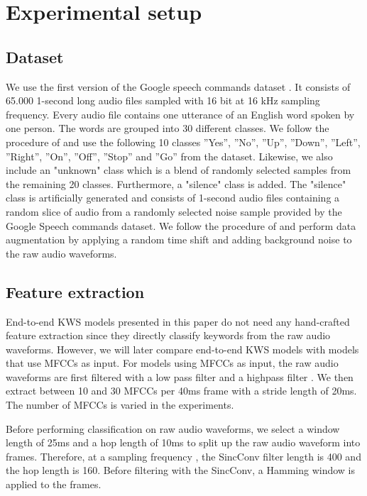 \documentclass[a4paper]{article}
\begin{document}
\section{Experimental setup}
\label{sec:experimental_setup}

\subsection{Dataset}
We use the first version of the Google speech commands dataset \cite{Warden2018}. It consists of 65.000 1-second long audio files sampled with 16 bit at 16 kHz sampling frequency. Every audio file contains one utterance of an English word spoken by one person. The words are grouped into 30 different classes. We follow the procedure of \cite{Tang2017} and use the following 10 classes ”Yes”, ”No”, ”Up”, ”Down”, ”Left”, ”Right”, ”On”, ”Off”, ”Stop” and ”Go” from the dataset. Likewise, we also include an "unknown" class which is a blend of randomly selected samples from the remaining 20 classes. Furthermore, a "silence" class is added. The "silence" class is artificially generated and consists of 1-second audio files containing a random slice of audio from a randomly selected noise sample provided by the Google Speech commands dataset. We follow the procedure of \cite{Tang2017} and perform data augmentation by applying a random time shift and adding background noise to the raw audio waveforms.

\subsection{Feature extraction}
End-to-end KWS models presented in this paper do not need any hand-crafted feature extraction since they directly classify keywords from the raw audio waveforms. However, we will later compare end-to-end KWS models with models that use MFCCs as input. For models using MFCCs as input, the raw audio waveforms are first filtered with a low pass filter  and a highpass filter . We then extract between 10 and 30 MFCCs per 40ms frame with a stride length of 20ms. The number of MFCCs is varied in the experiments.

Before performing classification on raw audio waveforms, we select a window length of 25ms and a hop length of 10ms to split up the raw audio waveform into frames. Therefore, at a sampling frequency , the SincConv filter length is 400 and the hop length is 160. Before filtering with the SincConv, a Hamming window is applied to the frames.
\end{document}
